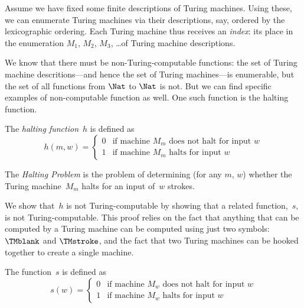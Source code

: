 \documentclass[../../../include/open-logic-section]{subfiles}
\begin{document}

\begin{explain}
Assume we have fixed some finite descriptions of Turing machines.
Using these, we can enumerate Turing machines via their descriptions,
say, ordered by the lexicographic ordering.  Each Turing machine thus
receives an \emph{index}: its place in the enumeration $M_1$, $M_2$,
$M_3$, \dots of Turing machine descriptions.

We know that there must be non-Turing-computable functions: the set of
Turing machine descritions---and hence the set of Turing machines---is
enumerable, but the set of all functions from $\Nat$ to $\Nat$ is
not. But we can find specific examples of non-computable function as
well. One such function is the halting function.
\end{explain}

\begin{defn} The \emph{halting function}~$h$ is defined as
\[
h(m,w) =
\begin{cases}
  \text{0} & \text{if machine~$M_m$ does not halt for input $w$} \\
  \text{1} & \text{if machine~$M_m$ halts for input $w$}
\end{cases}
\]
\end{defn}

\begin{defn}
The \emph{Halting Problem} is the problem of determining (for any $m$, $w$)
whether the Turing machine~$M_m$ halts for an input of~$w$ strokes.
\end{defn}

\begin{explain}
We show that~$h$ is not Turing-computable by showing that a related
function,~$s$, is not Turing-computable. This proof relies on the fact
that anything that can be computed by a Turing machine can be computed
using just two symbols: $\TMblank$ and $\TMstroke$, and the fact that two
Turing machines can be hooked together to create a single machine.
\end{explain}

\begin{defn} The function~$s$ is defined as
\[
s(w) =
\begin{cases}
  \text{0} & \text{if machine~$M_w$ does not halt for input $w$} \\
  \text{1} & \text{if machine~$M_w$ halts for input $w$}
\end{cases}
\]
\end{defn}
\end{document}
